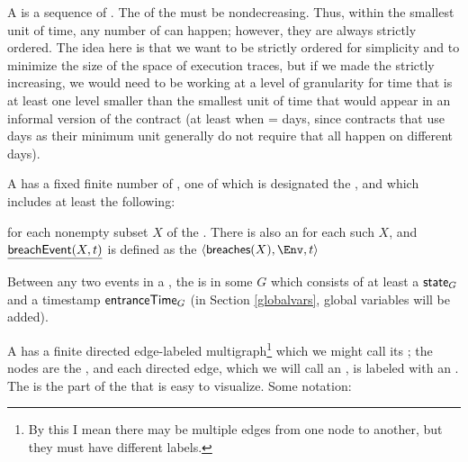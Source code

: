 \documentclass[12pt]{article}
\begin{document}
A  is a sequence of \Events. The \TimeStamps of the \Events must be nondecreasing. Thus, within the smallest unit of time, any number of \Events can happen; however, they are always strictly ordered. The idea here is that we want \Events to be strictly ordered for simplicity and to minimize the size of the space of execution traces, but if we made the \TimeStamps strictly increasing, we would need to be working at a level of granularity for time that is at least one level smaller than the smallest unit of time that would appear in an informal version of the contract (at least when \TimeUnit = days, since contracts that use days as their minimum unit generally do not require that all \Events happen on different days).

A \Contract has a fixed finite number of , one of which is designated the , and which includes at least the following:
\begin{LPPI}
\item {}
\item {} for each nonempty subset $X$ of the \Roles. There is also an \Action {} for each such $X$, and $\underline{\textsf{breachEvent}(X,t)}$ is defined as the \Event $\tup{\breaches{X}, \Env, t}$
\end{LPPI}
Between any two events in a \trace, the \Contract is in some  $G$ which consists of at least a \State $\textsf{state}_{G}$ and a timestamp $\textsf{entranceTime}_{G}$ (in Section \ref{globalvars}, global variables will be added).

\medskip

A \Contract has a finite directed edge-labeled multigraph\footnote{By this I mean there may be multiple edges from one node to another, but they must have different labels.} which we might call its ; the nodes are the \States, and each directed edge, which we will call an , is labeled with an \Action. The \skeleton is the part of the \Contract that is easy to visualize. Some notation:

\newcommand{\atransition}{an \transition}
\end{document}
